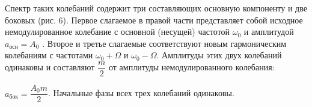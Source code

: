 \documentclass[a4paper, 12pt]{article}
\begin{document}
                Спектр таких колебаний содержит три составляющих  основную компоненту и две боковых (рис. 6). Первое слагаемое в правой части представляет собой исходное немодулированное колебание с основной (несущей) частотой $\omega_{0}$ и амплитудой $a_{осн} = A_{0}$ . Второе и третье слагаемые соответствуют новым гармоническим колебаниям с частотами $\omega_{0} + \Omega$ и $\omega_{0} - \Omega$. Амплитуды этих двух колебаний одинаковы и составляют $\dfrac{m}{2}$ от амплитуды немодулированного колебания:

                $a_{бок} = \dfrac{A_{0}m}{2}$. Начальные фазы всех трех колебаний одинаковы.
\end{document}
